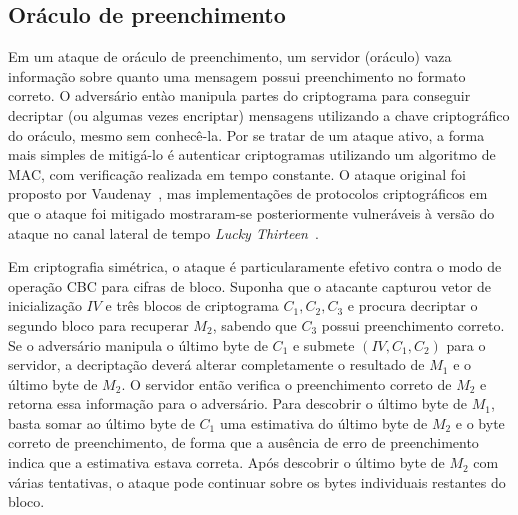 \subsection{Oráculo de preenchimento}

Em um ataque de oráculo de preenchimento, um servidor (oráculo) vaza informação sobre quanto uma mensagem possui preenchimento no formato correto.
O adversário entào manipula partes do criptograma para conseguir decriptar (ou algumas vezes encriptar) mensagens utilizando a chave criptográfico do oráculo, mesmo sem conhecê-la. Por se tratar de um ataque ativo, a forma mais simples de mitigá-lo é autenticar criptogramas utilizando um algoritmo de MAC, com verificação realizada em tempo constante. O ataque original foi proposto por Vaudenay~\cite{Vaudenay02}, mas implementações de protocolos criptográficos em que o ataque foi mitigado mostraram-se posteriormente vulneráveis à versão do ataque no canal lateral de tempo \emph{Lucky Thirteen}~\cite{AlFardanP13}.

Em criptografia simétrica, o ataque é particularamente efetivo contra o modo de operação CBC para cifras de bloco. Suponha que o atacante capturou vetor de inicialização $IV$ e três blocos de criptograma $C_1,C_2,C_3$ e procura decriptar o segundo bloco para recuperar $M_2$, sabendo que $C_3$ possui preenchimento correto. Se o adversário manipula o último byte de $C_1$ e submete $(IV, C_1, C_2)$ para o servidor, a decriptação deverá alterar completamente o resultado de $M_1$ e o último byte de $M_2$. O servidor então verifica o preenchimento correto de $M_2$ e retorna essa informação para o adversário. Para descobrir o último byte de $M_1$, basta somar ao último byte de $C_1$ uma estimativa do último byte de $M_2$ e o byte correto de preenchimento, de forma que a ausência de erro de preenchimento indica que a estimativa estava correta. Após descobrir o último byte de $M_2$ com várias tentativas, o ataque pode continuar sobre os bytes individuais restantes do bloco.

